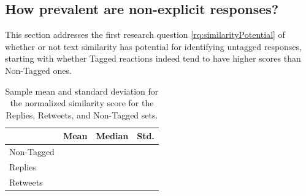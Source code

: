 \subsection{How prevalent are non-explicit responses?}

This section addresses the first research question \ref{rq:similarityPotential} of whether or not text similarity has potential for identifying untagged responses, starting with whether Tagged reactions indeed tend to have higher scores than Non-Tagged ones. 

\begin{table}[!tb]
	\centering
	\fontsize{9pt}{10pt}\selectfont
		\begin{tabular}{l|c|c|c|}
			\cline{2-4}
												& Mean					& Median					& Std. \\ \hline 
			\multicolumn{1}{|l|}{Non-Tagged}	& \nonTaggedScoreMean{}	&	\nonTaggedScoreMedian{}	& \nonTaggedScoreStd{} \\ \hline
			\multicolumn{1}{|l|}{Replies}		& \repliesScoreMean{}	&	\repliesScoreMedian{}	& \repliesScoreStd{} \\ \hline
			\multicolumn{1}{|l|}{Retweets}		& \retweetsScoreMean{}	&	\retweetsScoreMedian{}	& \retweetsScoreStd{} \\ \hline
		\end{tabular}
\caption{Sample mean and standard deviation for the normalized similarity score for the Replies, Retweets, and Non-Tagged sets.}
	\label{tab:sampleDistributionsStatistics}
\end{table}

